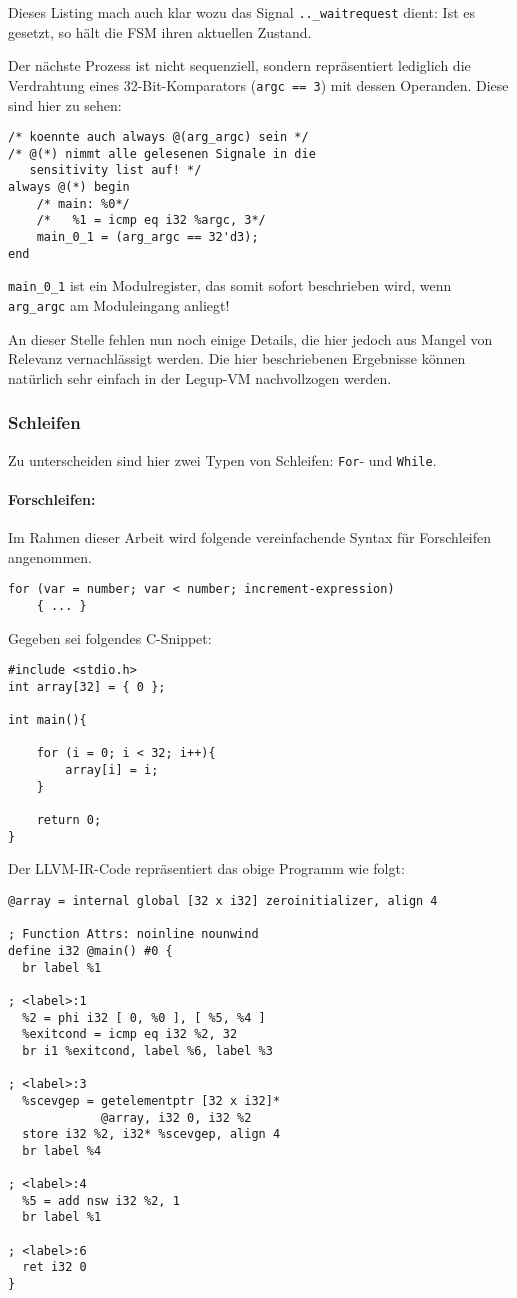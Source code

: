 \documentclass[oneside,a4paper]{article}
\def\V#1{\lstinline[style=verilog]{#1}}
\def\C#1{\lstinline[style=c]{#1}}
\begin{document}
Dieses Listing mach auch klar wozu das Signal \V{.._waitrequest}
dient: Ist es gesetzt, so hält die FSM ihren aktuellen Zustand.

Der nächste Prozess ist nicht sequenziell, sondern repräsentiert
lediglich die Verdrahtung eines 32-Bit-Komparators (\C{argc == 3}) mit dessen
Operanden. Diese sind hier zu sehen:
\begin{lstlisting}[style=verilog]
/* koennte auch always @(arg_argc) sein */
/* @(*) nimmt alle gelesenen Signale in die
   sensitivity list auf! */
always @(*) begin
    /* main: %0*/
    /*   %1 = icmp eq i32 %argc, 3*/
    main_0_1 = (arg_argc == 32'd3);
end
\end{lstlisting} %


\V{main_0_1} ist ein Modulregister, das somit sofort beschrieben
wird, wenn \V{arg_argc} am Moduleingang anliegt!

An dieser Stelle fehlen nun noch einige Details, die hier jedoch
aus Mangel von Relevanz vernachlässigt werden.
Die hier beschriebenen Ergebnisse können natürlich sehr einfach
in der Legup-VM nachvollzogen werden.

\subsubsection{Schleifen}
Zu unterscheiden sind hier zwei Typen von Schleifen:
\C{For}- und \C{While}.

\paragraph{Forschleifen:}
Im Rahmen dieser Arbeit wird folgende vereinfachende
Syntax für Forschleifen angenommen.

\begin{lstlisting}[style=c]
for (var = number; var < number; increment-expression)
    { ... }
\end{lstlisting}


Gegeben sei folgendes C-Snippet:
\begin{lstlisting}[style=c]
#include <stdio.h>
int array[32] = { 0 };

int main(){

    for (i = 0; i < 32; i++){
        array[i] = i;
    }

    return 0;
}
\end{lstlisting}


Der LLVM-IR-Code repräsentiert das obige Programm wie folgt:
\begin{lstlisting}[style=asm]
@array = internal global [32 x i32] zeroinitializer, align 4

; Function Attrs: noinline nounwind
define i32 @main() #0 {
  br label %1

; <label>:1
  %2 = phi i32 [ 0, %0 ], [ %5, %4 ]
  %exitcond = icmp eq i32 %2, 32
  br i1 %exitcond, label %6, label %3

; <label>:3
  %scevgep = getelementptr [32 x i32]*
             @array, i32 0, i32 %2
  store i32 %2, i32* %scevgep, align 4
  br label %4

; <label>:4
  %5 = add nsw i32 %2, 1
  br label %1

; <label>:6
  ret i32 0
}
\end{lstlisting}
\end{document}
